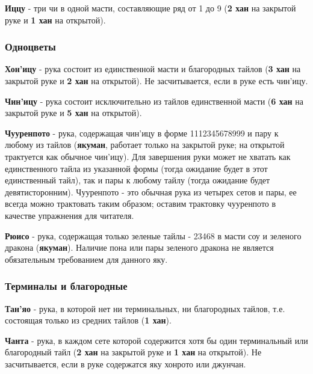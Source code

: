  \hfill {}

\textbf{Иццу} - три чи в одной масти, составляющие ряд от 1 до 9 (\textbf{2 хан} на закрытой руке и \textbf{1 хан} на открытой).

 \hfill {}

\subsubsection{Одноцветы}

\textbf{Хон'ицу} - рука состоит из единственной масти и благородных тайлов (\textbf{3 хан} на закрытой руке и \textbf{2 хан} на открытой). Не засчитывается, если в руке есть чин'ицу.

 \hfill {}

\textbf{Чин'ицу} - рука состоит исключительно из тайлов единственной масти (\textbf{6 хан} на закрытой руке и \textbf{5 хан} на открытой).

\textbf{Чууренпото} - рука, содержащая чин'ицу в форме 1112345678999 и пару к любому из тайлов (\textbf{якуман}, работает только на закрытой руке; на открытой трактуется как обычное чин'ицу). Для завершения руки может не хватать как единственного тайла из указанной формы (тогда ожидание будет в этот единственный тайл), так и пары к любому тайлу (тогда ожидание будет девятисторонним). Чууренпото - это обычная рука из четырех сетов и пары, ее всегда можно трактовать таким образом; оставим трактовку чууренпото в качестве упражнения для читателя.


\textbf{Рюисо} - рука, содержащая только зеленые тайлы - 23468 в масти соу и зеленого дракона (\textbf{якуман}). Наличие пона или пары зеленого дракона не является обязательным требованием для данного яку.

 \hfill {}

\subsubsection{Терминалы и благородные}

\textbf{Тан'яо} - рука, в которой нет ни терминальных, ни благородных тайлов, т.е. состоящая только из средних тайлов (\textbf{1 хан}).

 \hfill {}

\textbf{Чанта} - рука, в каждом сете которой содержится хотя бы один терминальный или благородный тайл (\textbf{2 хан} на закрытой руке и \textbf{1 хан} на открытой). Не засчитывается, если в руке содержатся яку хонрото или джунчан.

